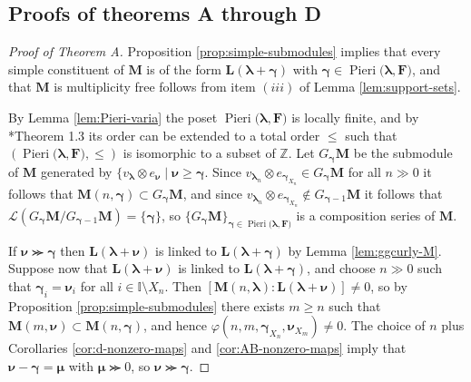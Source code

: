 \documentclass[11pt,fleqn]{amsart}
\newcommand\ZZ{\mathbb Z}
\newcommand\II{\mathbb I}
\renewcommand\phi{\varphi}
\theoremstyle{definition}
\theoremstyle{remark}
\theoremstyle{remark}
\newcommand\wt[1]{\boldsymbol{#1}}
\newcommand\Pieri[2]{\operatorname{Pieri}{(#1},{#2)}}
\newcommand\map[4]{\phi(#3,#4,#1,#2)}
\begin{document}
\subsection{Proofs of theorems A through D}
\label{ss:proofs}
\begin{proof}[Proof of Theorem A]
Proposition \ref{prop:simple-submodules} implies that every simple constituent 
of $\mathbf M$ is of the form $\mathbf L(\wt\lambda + \wt\gamma)$ with 
$\wt\gamma \in \Pieri{\wt\lambda}{\mathbf F}$, and that $\mathbf M$ is 
multiplicity free follows from item $(iii)$ of Lemma \ref{lem:support-sets}. 

By Lemma \ref{lem:Pieri-varia} the poset 
$\Pieri{\wt\lambda}{\mathbf F}$ is locally finite, and by \cite{FM12}*{Theorem 
1.3} its order can be extended to a total order $\leq$ such that $(\Pieri{
\wt\lambda}{\mathbf F}, \leq)$ is isomorphic to a subset of $\ZZ$.
Let $G_{\wt\gamma} \mathbf M$ be the submodule of $\mathbf M$ generated by $\{
v_{\wt\lambda} \otimes e_{\wt\nu} \mid \wt\nu \geq \wt\gamma$. Since 
$v_{\wt\lambda_n} \otimes e_{\wt\gamma_{X_n}} \in G_{\wt\gamma} \mathbf M$
for all $n \gg 0$ it follows that $\mathbf M(n,\wt\gamma) \subset G_{\wt\gamma} 
\mathbf M$, and since $v_{\wt\lambda_n} \otimes e_{\wt\gamma_{X_n}} \notin 
G_{\wt\gamma-1} \mathbf M$ it follows that $\mathcal L(G_{\wt\gamma} \mathbf 
M/G_{\wt\gamma-1} \mathbf M) = \{\wt\gamma\}$, so $\{G_{\wt\gamma} \mathbf M
\}_{\wt\gamma \in \Pieri{\wt\lambda}{\mathbf F}}$ is a composition series
of $\mathbf M$.

If $\wt\nu \ggcurly \wt\gamma$ then $\mathbf L(\wt\lambda + \wt\nu)$ is linked
to $\mathbf L(\wt\lambda + \wt\gamma)$ by Lemma \ref{lem:ggcurly-M}. Suppose 
now that $\mathbf L(\wt\lambda+\wt\nu)$ is linked to $\mathbf L(\wt\lambda+
\wt\gamma)$, and choose $n \gg 0$ such that $\wt\gamma_i = \wt\nu_i$ for all 
$i \in \II \setminus X_n$. Then $[\mathbf M(n, \wt\lambda): \mathbf 
L(\wt\lambda + \wt\nu)] \neq 0$, so by Proposition \ref{prop:simple-submodules} 
there exists $m \geq n$ such that $\mathbf M(m,\wt\nu) \subset \mathbf 
M(n,\wt\gamma)$, and hence $\map{\wt\gamma_{X_n}}{\wt\nu_{X_m}}{n}{m} \neq 0$.
The choice of $n$ plus Corollaries \ref{cor:d-nonzero-maps} and 
\ref{cor:AB-nonzero-maps} imply that $\wt\nu - \wt\gamma = \wt\mu$ with
$\wt\mu \ggcurly 0$, so $\wt\nu \ggcurly \wt\gamma$.
\end{proof}
\end{document}
